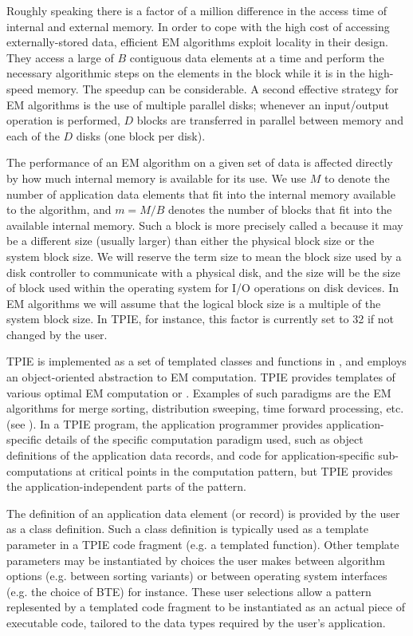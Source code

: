 Roughly speaking there is a factor of a million difference
in the access time of internal and external memory.  In
order to cope with the high cost of accessing
externally-stored data, efficient EM algorithms exploit
locality in their design.  They access a large 
of $B$ contiguous data elements at a time and perform the
necessary algorithmic steps on the elements in the block
while it is in the high-speed memory. The speedup can be
considerable.  A second effective strategy for EM algorithms
is the use of multiple parallel disks; whenever an
input/output operation is performed, $D$ blocks are
transferred in parallel between memory and each of the $D$
disks (one block per disk).

The performance of an EM algorithm on a given set of data is
affected directly by how much internal memory is available
for its use. We use $M$ to denote the number of application
data elements that fit into the internal memory available to
the algorithm, and $m=M/B$ denotes the number of blocks that
fit into the available internal memory. Such a block is more precisely
called a  because it may be a different
size (usually larger) than either the physical block size or
the system block size. We will reserve the term
 size to mean the 
block size used by a disk controller to communicate with
a physical disk, and the  size will be the
size of block used within the operating system for I/O
operations on disk devices. In EM algorithms we will assume
that the logical block size is a multiple of the system
block size. In TPIE, for instance, this factor is currently
set to 32 if not changed by the user.

TPIE is implemented as a set of templated classes and
functions in \CPP{}, and employs an object-oriented abstraction
to EM computation. TPIE provides \CPP{} templates of various
optimal EM computation  or .
Examples of such paradigms are the EM algorithms for merge
sorting, distribution sweeping, time forward processing,
etc. (see \cite{vitter:dimacssurvey}). In a TPIE program, the
application programmer provides application-specific details
of the specific computation paradigm used, such as \CPP{}
object definitions of the application data records, and code
for application-specific sub-computations at critical points
in the computation pattern, but TPIE provides the
application-independent parts of the pattern.  

The definition of an application data element (or record) is
provided by the user as a class definition.  Such a class
definition is typically used as a template parameter in a
TPIE code fragment (e.g. a templated function). Other
template parameters may be instantiated by choices the user
makes between algorithm options (e.g. between sorting
variants) or between operating system interfaces (e.g. the
choice of BTE) for instance. These user selections allow a
pattern replesented by a templated \CPP{} code fragment to be
instantiated as an actual piece of executable code, tailored
to the data types required by the user's application.


